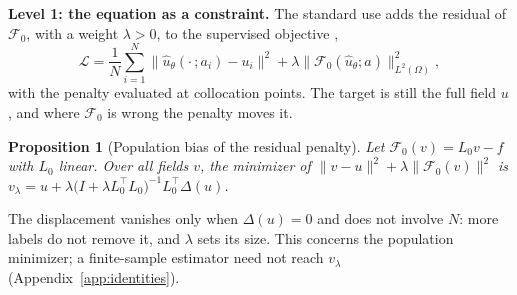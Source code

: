 \documentclass{article}
\newtheorem{proposition}{Proposition}
\begin{document}
\textbf{Level 1: the equation as a constraint.}
The standard use adds the residual of $\mathcal{F}_0$, with a weight $\lambda>0$, to the supervised objective \citep{raissi2019physics,li2024physics,wang2021learning},
\begin{equation}
  \mathcal{L}
  =\frac{1}{N}\sum_{i=1}^{N}\bigl\|\hat u_\theta(\cdot\,;a_i)-u_i\bigr\|^{2}
   +\lambda\bigl\|\mathcal{F}_0(\hat u_\theta;a)\bigr\|_{L^{2}(\Omega)}^{2},
  \label{eq:pde-loss}
\end{equation}
with the penalty evaluated at collocation points. The target is still the full field $u$, and where $\mathcal{F}_0$ is wrong the penalty moves it.
\begin{proposition}[Population bias of the residual penalty]
\label{prop:pi-bias}
Let $\mathcal{F}_0(v)=L_0v-f$ with $L_0$ linear. Over all fields $v$, the minimizer of $\|v-u\|^{2}+\lambda\|\mathcal{F}_0(v)\|^{2}$ is
$v_\lambda=u+\lambda\bigl(I+\lambda L_0^{\!\top}L_0\bigr)^{-1}L_0^{\!\top}\Delta(u)$.
\end{proposition}
The displacement vanishes only when $\Delta(u)=0$ and does not involve $N$: more labels do not remove it, and $\lambda$ sets its size. This concerns the population minimizer; a finite-sample estimator need not reach $v_\lambda$ (Appendix~\ref{app:identities}).
\end{document}
